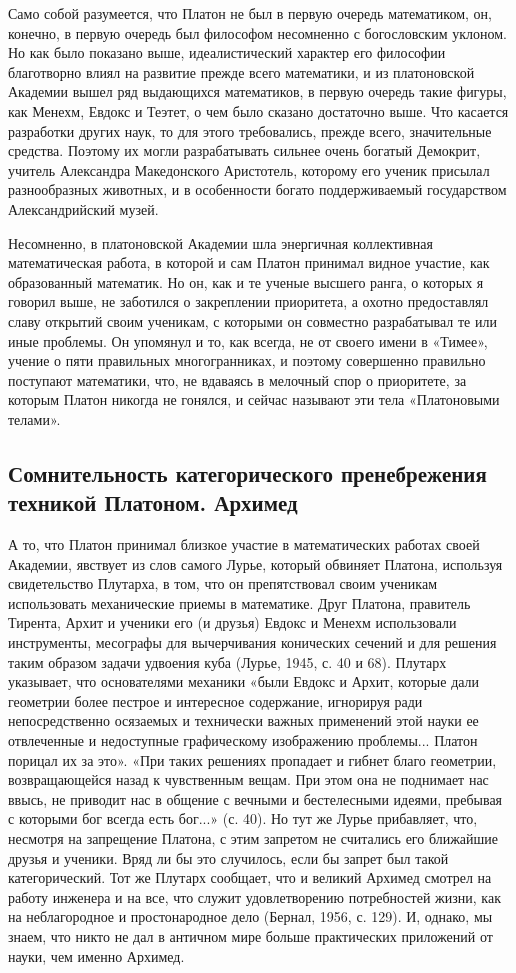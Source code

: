 Само собой разумеется, что Платон не был в первую очередь математиком,
он, конечно, в первую очередь был философом несомненно с богословским
уклоном. Но как было показано выше, идеалистический характер его
философии благотворно влиял на развитие прежде всего математики, и из
платоновской Академии вышел ряд выдающихся математиков, в первую
очередь такие фигуры, как Менехм, Евдокс и Теэтет, о чем было сказано
достаточно выше. Что касается разработки других наук, то для этого
требовались, прежде всего, значительные средства. Поэтому их могли
разрабатывать сильнее очень богатый Демокрит, учитель Александра
Македонского Аристотель, которому его ученик присылал разнообразных
животных, и в особенности богато поддерживаемый государством
Александрийский музей.

Несомненно, в платоновской Академии шла энергичная коллективная
математическая работа, в которой и сам Платон принимал видное участие,
как образованный математик. Но он, как и те ученые высшего ранга, о
которых я говорил выше, не заботился о закреплении приоритета, а
охотно предоставлял славу открытий своим ученикам, с которыми он
совместно разрабатывал те или иные проблемы. Он упомянул и то, как
всегда, не от своего имени в «Тимее», учение о пяти правильных
многогранниках, и поэтому совершенно правильно поступают математики,
что, не вдаваясь в мелочный спор о приоритете, за которым Платон
никогда не гонялся, и сейчас называют эти тела «Платоновыми телами».

\subsection{Сомнительность категорического пренебрежения техникой
Платоном. Архимед}

А то, что Платон принимал близкое участие в математических работах
своей Академии, явствует из слов самого Лурье, который обвиняет
Платона, используя свидетельство Плутарха, в том, что он препятствовал
своим ученикам использовать механические приемы в математике. Друг
Платона, правитель Тирента, Архит и ученики его (и друзья) Евдокс и
Менехм использовали инструменты, месографы для вычерчивания конических
сечений и для решения таким образом задачи удвоения куба (Лурье, 1945,
с. 40 и 68). Плутарх указывает, что основателями механики «были Евдокс
и Архит, которые дали геометрии более пестрое и интересное содержание,
игнорируя ради непосредственно осязаемых и технически важных
применений этой науки ее отвлеченные и недоступные графическому
изображению проблемы... Платон порицал их за это». «При таких решениях
пропадает и гибнет благо геометрии, возвращающейся назад к чувственным
вещам. При этом она не поднимает нас ввысь, не приводит нас в общение
с вечными и бестелесными идеями, пребывая с которыми бог всегда есть
бог...» (с. 40). Но тут же Лурье прибавляет, что, несмотря на
запрещение Платона, с этим запретом не считались его ближайшие друзья
и ученики. Вряд ли бы это случилось, если бы запрет был такой
категорический. Тот же Плутарх сообщает, что и великий Архимед смотрел
на работу инженера и на все, что служит удовлетворению потребностей
жизни, как на неблагородное и простонародное дело (Бернал, 1956, с.
129). И, однако, мы знаем, что никто не дал в античном мире больше
практических приложений от науки, чем именно Архимед.

